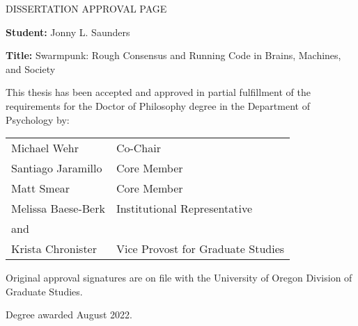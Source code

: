 
\begin{center}
DISSERTATION APPROVAL PAGE
\end{center}

\noindent\textbf{Student:} Jonny L. Saunders

\noindent\textbf{Title:} Swarmpunk: Rough Consensus and Running Code in Brains, Machines, and Society

\vspace{1cm}

\noindent This thesis has been accepted and approved in partial fulfillment of the requirements for the Doctor of Philosophy degree in the Department of Psychology by:

\vspace{1cm}

\noindent\begin{tabular}{@{}ll}
Michael Wehr & Co-Chair \\
Santiago Jaramillo & Core Member \\
Matt Smear & Core Member \\
Melissa Baese-Berk & Institutional Representative \\
and & \\
Krista Chronister & Vice Provost for Graduate Studies \\
\end{tabular}

\vspace{1cm}

\noindent Original approval signatures are on file with the University of Oregon Division of Graduate Studies.

\noindent Degree awarded August 2022.
